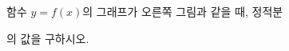 \noindent\begin{minipage}[t]{0.58\linewidth}\vspace{0pt}\raggedright 함수 $y=f(x)$의 그래프가 오른쪽 그림과 같을 때, 정적분\par\smallskip\end{minipage}\hfill\begin{minipage}[t]{0.4\linewidth}\vspace{0pt}\centering \resizebox{\ifdim\width>\linewidth\linewidth\else\width\fi}{!}{}\end{minipage}\par
\noindent {}\par\smallskip\noindent 의 값을 구하시오.
